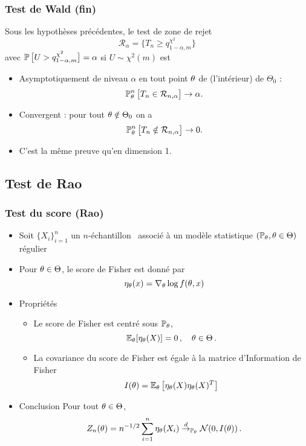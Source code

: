 \begin{frame}
\frametitle{Test de Wald (fin)}
\begin{prop}
Sous les hypothèses précédentes, le test de zone de rejet
$${\mathcal R}_\alpha  = \big\{T_n \geq q_{1-\alpha, m}^{\chi^2}\big\}$$
avec $\operatorname{{\mathbb P}}\big[U > q_{1-\alpha, m}^{\chi^2}\big]=\alpha$ si $U \sim \chi^2(m)$ est
\begin{itemize}
\item \alert{Asymptotiquement de niveau $\alpha$} en tout point $\theta$ de (l'intérieur) de $\Theta_0$ :
$$\operatorname{{\mathbb P}}_\theta^n\big[T_n \in {\mathcal R}_{n,\alpha}\big]\rightarrow \alpha.$$
\item \alert{Convergent} : pour tout $\theta \notin \Theta_0$ on a
$$\operatorname{{\mathbb P}}_\theta^n\big[T_n \notin {\mathcal R}_{n,\alpha}\big]\rightarrow 0.$$
\end{itemize}
\end{prop}
\begin{itemize}
\item C'est la  même preuve qu'en dimension 1.
\end{itemize}
\end{frame}



\subsection{Test de Rao}


\begin{frame}
\frametitle{Test du score (Rao)}
\begin{itemize}
\item Soit $\{X_i\}_{i=1}^n$ un $n$-échantillon \iid\ associé à un modèle statistique $(\operatorname{{\mathbb P}}_\theta, \theta \in \Theta)$  \alert{régulier}
\item Pour $\theta \in \Theta$, le \alert{score de Fisher} est donné par
\[
\eta_{\theta}(x)= \nabla_{\theta} \log f(\theta,x)
\]
\item \alert{Propriétés}
\begin{itemize}
\item Le score de Fisher est centré sous $\operatorname{{\mathbb P}}_{\theta}$,
$$
\operatorname{{\mathbb E}}_{\theta}[\eta_{\theta}(X)]= 0 \,, \quad \theta \in \Theta \,.
$$
\item La covariance du score de Fisher est égale à la \alert{matrice d'Information de Fisher}
$$
I(\theta)= \operatorname{{\mathbb E}}_{\theta} \left[ \eta_{\theta}(X) \eta_{\theta}(X)^T \right]
$$
\end{itemize}
\item \alert{Conclusion} Pour tout $\theta \in \Theta$,
$$
Z_n(\theta) = n^{-1/2} \sum_{i=1}^n \eta_\theta(X_i) \stackrel{d}{\rightarrow}_{\operatorname{{\mathbb P}}_{\theta}} \mathcal{N}(0, I(\theta)) \,.
$$
\end{itemize}
\end{frame}

